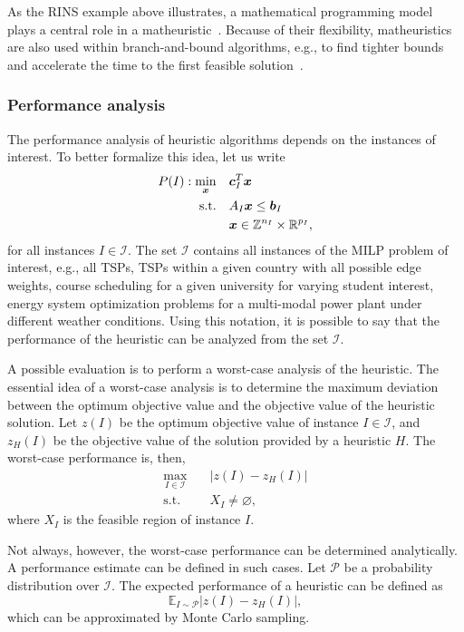 As the RINS example above illustrates, a mathematical programming model plays a central role in a matheuristic~\cite{fischettiMatheuristics2016}.
Because of their flexibility, matheuristics are also used within branch-and-bound algorithms, e.g., to find tighter bounds and accelerate the time to the first feasible solution~\cite{fischettiMatheuristics2016,maniezzoMatheuristicsAlgorithmsImplementations2021}.

\subsubsection{Performance analysis}

The performance analysis of heuristic algorithms depends on the instances of interest.
To better formalize this idea, let us write
\begin{align*}
    P(I): \min_{\bm{x}} \quad & \bm{c}_I^{T}\bm{x} \\
    \textrm{s.t.} \quad & A_I\bm{x} \le \bm{b}_I \\
      & \bm{x}\in \mathbb{Z}^{n_I}\times \mathbb{R}^{p_I}
,\end{align*}
for all instances $I\in \mathcal{I}$.
The set $\mathcal{I}$ contains all instances of the MILP problem of interest, e.g., all TSPs, TSPs within a given country with all possible edge weights, course scheduling for a given university for varying student interest, energy system optimization problems for a multi-modal power plant under different weather conditions.
Using this notation, it is possible to say that the performance of the heuristic can be analyzed from the set $\mathcal{I}$.

A possible evaluation is to perform a worst-case analysis of the heuristic.
The essential idea of a worst-case analysis is to determine the maximum deviation between the optimum objective value and the objective value of the heuristic solution. 
Let $z(I)$ be the optimum objective value of instance $I\in \mathcal{I}$, and $z_H(I)$ be the objective value of the solution provided by a heuristic $H$.
The worst-case performance is, then,
\begin{equation}
    \begin{split}
	\max_{I\in \mathcal{I}} \quad& |z(I) - z_H(I)| \\
	\textrm{s.t.} \quad& X_I \neq \varnothing
    ,\end{split}
\end{equation}
where $X_I$ is the feasible region of instance $I$.

Not always, however, the worst-case performance can be determined analytically.
A performance estimate can be defined in such cases.
Let $\mathcal{P}$ be a probability distribution over $\mathcal{I}$.
The expected performance of a heuristic can be defined as \[
    \mathbb{E}_{I\sim \mathcal{P}} |z(I) - z_H(I)|
,\] which can be approximated by Monte Carlo sampling.



